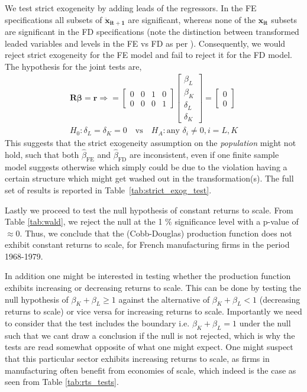 We test strict exogeneity by adding leads of the regressors. In the FE specifications all subsets of $\bm{\ddot{x}_{it+1}}$ are significant, whereas none of the $\bm{x_{it}}$ subsets are significant in the FD specifications (note the distinction between transformed leaded variables and levels in the FE vs FD  as per \cite{wooldridgeEconometricAnalysisCross2010}). Consequently, we would reject strict exogeneity for the FE model and fail to reject it for the FD model. The hypothesis for the joint tests are, 
\begin{align*}
    \bm{R} \bm{\beta} = \bm{r} \Longrightarrow = \begin{bmatrix}
0 & 0 & 1 & 0 \\
0 & 0 & 0 & 1
\end{bmatrix} \begin{bmatrix}
\beta_L \\ \beta_K \\ \delta_{L} \\ \delta_{K}
\end{bmatrix} = \begin{bmatrix}
0 \\ 0
\end{bmatrix} \\
H_0: \delta_L = \delta_K = 0 \quad \text{vs} \quad H_A: \text{any } \delta_i \neq 0, i=L, K
\end{align*}
This suggests that the strict exogeneity assumption on the \textit{population} might not hold, such that both $\hat{\beta}_{\text{FE}}$ and $\hat{\beta}_{\text{FD}}$ are inconsistent, even if one finite sample model suggests otherwise which simply could be due to the violation having a certain structure which might get washed out in the transformation(s). The full set of results is reported in Table~\ref{tab:strict_exog_test}. 



\hline 

Lastly we proceed to test the null hypothesis of constant returns to scale. From Table \ref{tab:wald}, we reject the null at the 1 \% significance level with a p-value of $\approx 0$. Thus, we conclude that the (Cobb-Douglas) production function does not exhibit constant returns to scale, for French manufacturing firms in the period 1968-1979. 



In addition one might be interested in testing whether the production function exhibits increasing or decreasing returns to scale. This can be done by testing the null hypothesis of $\beta_K + \beta_L \geq 1$ against the alternative of $\beta_K + \beta_L < 1$ (decreasing returns to scale) or vice versa for increasing returns to scale. Importantly we need to consider that the test includes the boundary i.e. $\beta_K + \beta_L = 1$ under the null such that we cant draw a conclusion if the null is not rejected, which is why the tests are read somewhat opposite of what one might expect. One might suspect that this particular sector exhibits increasing returns to scale, as firms in manufacturing often benefit from economies of scale, which indeed is the case as seen from Table \ref{tab:rts_tests}.


